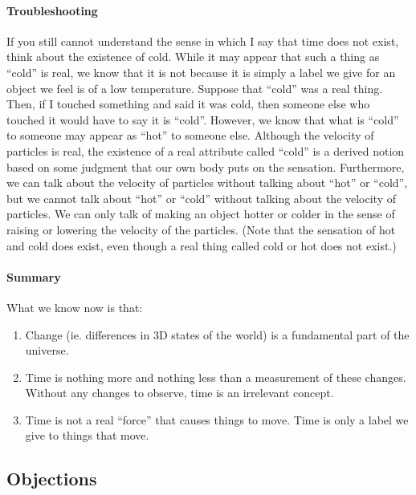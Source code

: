 \documentclass[a4paper, 12pt]{article}
\begin{document}
\paragraph{Troubleshooting}
If you still cannot understand the sense in which I say that time does not exist, think about the existence of cold. While it may appear that such a thing as ``cold'' is real, we know that it is not because it is simply a label we give for an object we feel is of a low temperature. Suppose that ``cold'' was a real thing. Then, if I touched something and said it was cold, then someone else who touched it would have to say it is ``cold''. However, we know that what is ``cold'' to someone may appear as ``hot'' to someone else. Although the velocity of particles is real, the existence of a real attribute called ``cold'' is a derived notion based on some judgment that our own body puts on the sensation. Furthermore, we can talk about the velocity of particles without talking about ``hot'' or ``cold'', but we cannot talk about ``hot'' or ``cold'' without talking about the velocity of particles. We can only talk of making an object hotter or colder in the sense of raising or lowering the velocity of the particles. (Note that the sensation of hot and cold does exist, even though a real thing called cold or hot does not exist.) \\
\paragraph{Summary}
What we know now is that: \\
\begin{enumerate}
  \item Change (ie. differences in 3D states of the world) is a fundamental part of the universe.
  \item Time is nothing more and nothing less than a measurement of these changes. Without any changes to observe, time is an irrelevant concept.
  \item Time is not a real ``force'' that causes things to move. Time is only a label we give to things that move.
\end{enumerate}
\subsection{Objections}
\end{document}
